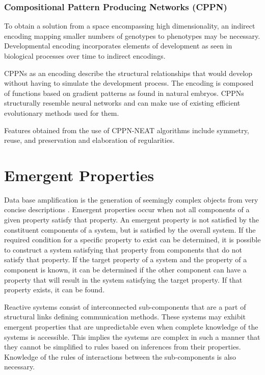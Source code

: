 \subsubsection{Compositional Pattern Producing Networks (CPPN)}

To obtain a solution from a space encompassing high dimensionality, an indirect encoding mapping smaller numbers of genotypes to phenotypes may be necessary. Developmental encoding incorporates elements of development as seen in biological processes over time to indirect encodings. \citep{Hornby2001}

CPPNs as an encoding describe the structural relationships that would develop without having to simulate the development process. The encoding is composed of functions based on gradient patterns as found in natural embryos. CPPNs structurally resemble neural networks and can make use of existing efficient evolutionary methods used for them. \citep{Stanley2006}

Features obtained from the use of CPPN-NEAT algorithms include symmetry, reuse, and preservation and elaboration of regularities. \citep{Stanley2006}

\section{Emergent Properties}

Data base amplification is the generation of seemingly complex objects from very concise descriptions \citep{Prusinkiewicz2004}. Emergent properties occur when not all components of a given property satisfy that property. An emergent property is not satisfied by the constituent components of a system, but is satisfied by the overall system. If the required condition for a specific property to exist can be determined, it is possible to construct a system satisfying that property from components that do not satisfy that property. If the target property of a system and the property of a component is known, it can be determined if the other component can have a property that will result in the system satisfying the target property. If that property exists, it can be found. \citep{Zakinthinos1998}

Reactive systems consist of interconnected sub-components that are a part of structural links defining communication methods. These systems may exhibit emergent properties that are unpredictable even when complete knowledge of the systems is accessible. This implies the systems are complex in such a manner that they cannot be simplified to rules based on inferences from their properties. Knowledge of the rules of interactions between the sub-components is also necessary. \citep{Aiguier2008}

